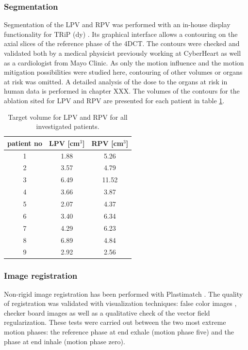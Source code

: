 \documentclass[type=dr, dr=rernat, accentcolor=tud7b,colorbacktitle, bigchapter, openright, twoside, 12pt ]{tudthesis}
\begin{document}
\subsubsection{Segmentation}
Segmentation of the LPV and RPV was performed with an in-house display functionality for TRiP (dy) \cite{Hil09}. Its graphical interface 
allows a contouring on the axial slices of the reference phase of the 4DCT. The contours were checked and validated both by a medical physicist 
previously working at CyberHeart as well as a cardiologist from Mayo Clinic. As only the motion influence and the motion mitigation 
possibilities were studied here, contouring of other volumes or organs at risk was omitted. A detailed analysis of the dose to the organs at risk 
in human data is performed in chapter XXX. The volumes of the contours for the ablation sited for LPV and RPV are presented for each patient 
in table \ref{tab:volume}. 

\begin{table}[htbp]
  \centering
  \caption{Target volume for LPV and RPV for all investigated patients.}
  \begin{tabular}{|c|c|c|}
    \hline\hline
    patient no\rule{0pt}{2.6ex}\rule[-1.2ex]{0pt}{0pt} & LPV [cm$^{3}$] & RPV [cm$^{3}$]\\
    \hline
    1 & 1.88 & 5.26 \\
    2 & 3.57 & 4.79 \\
    3 & 6.49 & 11.52 \\
    4 & 3.66 & 3.87 \\
    5 & 2.07 & 4.37 \\
    6 & 3.40 & 6.34 \\
    7 & 4.29 & 6.23 \\
    8 & 6.89 & 4.84 \\
    9 & 2.92 & 2.56 \\
    \hline\hline
  \end{tabular}
  \label{tab:volume}
\end{table}


\subsubsection{Image registration}
Non-rigid image registration has been performed with Plastimatch \cite{Sharp07} \cite{Shack10}. The quality of registration 
was validated with visualization techniques: false color images \cite{Bro07}, checker board images \cite{Bro07} as well as a qualitative  
check of the vector field regularization. These tests were carried out between the two most extreme motion phases: the reference phase at end 
exhale (motion phase five) and the phase at end inhale (motion phase zero).  
\end{document}

